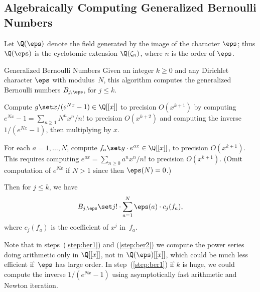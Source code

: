 \subsection{Algebraically Computing Generalized Bernoulli Numbers}
Let $\Q(\eps)$ denote the field generated by the image
of the character $\eps$; thus $\Q(\eps)$ is the cyclotomic
extension $\Q(\zeta_n)$, where $n$ is the order of $\eps$.
\begin{algorithm}{Generalized Bernoulli Numbers}\label{alg:gen_bernoulli}
Given an integer $k\geq 0$ and any
Dirichlet character  $\eps$ with modulus~$N$, this algorithm computes
the generalized Bernoulli numbers $B_{j,\eps}$, for $j\leq k$.
\begin{steps}
\item{}\label{step:ber1} Compute $g \set x/(e^{Nx}-1) \in \Q[[x]]$ to
  precision $O(x^{k+1})$
by computing $e^{Nx}-1 = \sum_{n\geq 1} N^n x^n/n!$ 
to precision $O(x^{k+2})$ and computing the inverse
$1/(e^{Nx}-1)$, then multiplying by $x$.  
\item{}\label{step:ber2} For each $a=1,\ldots, N$, compute $f_a \set g
  \cdot e^{ax}\in\Q[[x]]$, to precision $O(x^{k+1})$.  This requires
computing $e^{ax}=\sum_{n\geq 0} a^n x^n/n!$ to precision $O(x^{k+1})$.
(Omit computation of $e^{Nx}$ if $N>1$ since then $\eps(N)=0$.)

\item{}\label{step:ber4} Then for $j\leq k$, we have 
$$B_{j,\eps} \set j!\cdot 
  \sum_{a=1}^{N} \eps(a) \cdot c_j(f_a),
$$ where $c_j(f_a)$ is the
  coefficient of $x^j$ in~$f_a$.
\end{steps}
\end{algorithm}
Note that in steps~(\ref{step:ber1}) and (\ref{step:ber2}) we compute the
power series doing arithmetic only in $\Q[[x]]$, not in
$\Q(\eps)[[x]]$, which could be much less efficient if~$\eps$ has
large order.   In step~(\ref{step:ber1}) if $k$ is huge,
we could compute the inverse $1/(e^{Nx}-1)$ using
asymptotically fast arithmetic and
Newton iteration.

